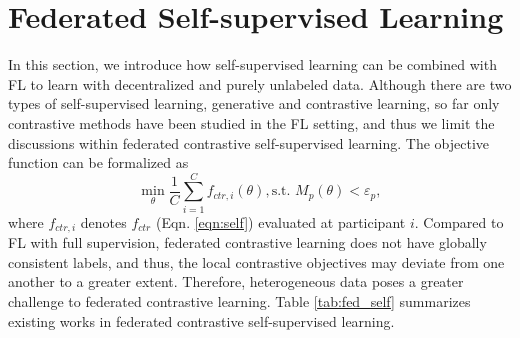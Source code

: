 \documentclass[11pt]{article}
\begin{document}
\section{Federated Self-supervised Learning}\label{sec:fed-self}
In this section, we introduce how self-supervised learning can be combined with FL to learn with decentralized and purely unlabeled data. Although there are two types of self-supervised learning, generative and contrastive learning, so far only contrastive methods have been studied in the FL setting, and thus we limit the discussions within federated contrastive self-supervised learning. The objective function can be formalized as 
\begin{equation}
    \min_\theta \frac{1}{C}\sum_{i=1}^Cf_{ctr, i}(\theta), \text{s.t. }M_p(\theta)< \varepsilon_p,
\end{equation}
where $f_{ctr, i}$ denotes $f_{ctr}$ (Eqn. \ref{eqn:self}) evaluated at participant $i$. Compared to FL with full supervision, federated contrastive learning does not have globally consistent labels, and thus, the local contrastive objectives may deviate from one another to a greater extent. Therefore, heterogeneous data poses a greater challenge to federated contrastive learning. Table \ref{tab:fed_self} summarizes existing works in federated contrastive self-supervised learning. 
\begin{table}[t]
    \centering
    \caption{Summary of techniques for federated self-supervised learning. $\times$ indicates that the proposed method does not focus on this issue. }
    \label{tab:fed_self}
\end{table}
\end{document}
